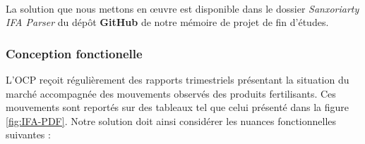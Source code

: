 	\paragraph{}
	La solution que nous mettons en œuvre est disponible dans le dossier \textit{Sanxoriarty IFA Parser} du dépôt \textbf{GitHub} de notre mémoire de projet de fin d'études\cite{this}.
	\subsubsection{Conception fonctionelle}
	L'OCP reçoit régulièrement des rapports trimestriels présentant la situation du marché accompagnée des mouvements observés des produits fertilisants. Ces mouvements sont reportés sur des tableaux tel que celui présenté dans la figure \ref{fig:IFA-PDF}. Notre solution doit ainsi considérer les nuances fonctionnelles suivantes :\newpage
